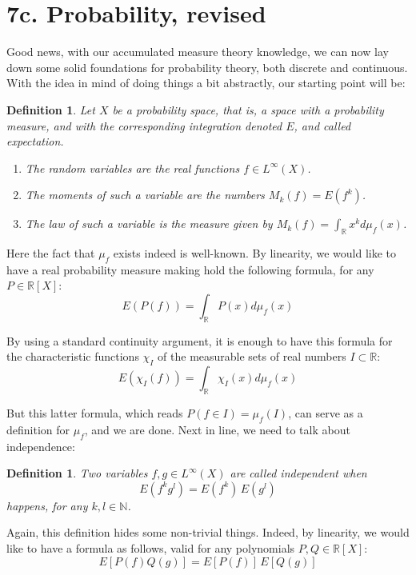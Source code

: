\documentclass[12pt]{amsbook}
\newtheorem{definition}[theorem]{Definition}
\begin{document}
\section*{7c. Probability, revised}

Good news, with our accumulated measure theory knowledge, we can now lay down some solid foundations for probability theory, both discrete and continuous. With the idea in mind of doing things a bit abstractly, our starting point will be:

\begin{definition}
Let $X$ be a probability space, that is, a space with a probability measure, and with the corresponding integration denoted $E$, and called expectation.
\begin{enumerate}
\item The random variables are the real functions $f\in L^\infty(X)$.

\item The moments of such a variable are the numbers $M_k(f)=E(f^k)$.

\item The law of such a variable is the measure given by $M_k(f)=\int_\mathbb Rx^kd\mu_f(x)$.
\end{enumerate}
\end{definition}

Here the fact that $\mu_f$ exists indeed is well-known. By linearity, we would like to have a real probability measure making hold the following formula, for any $P\in\mathbb R[X]$:
$$E(P(f))=\int_\mathbb RP(x)d\mu_f(x)$$

By using a standard continuity argument, it is enough to have this formula for the characteristic functions $\chi_I$ of the measurable sets of real numbers $I\subset\mathbb R$:
$$E(\chi_I(f))=\int_\mathbb R\chi_I(x)d\mu_f(x)$$

But this latter formula, which reads $P(f\in I)=\mu_f(I)$, can serve as a definition for $\mu_f$, and we are done. Next in line, we need to talk about independence:


\begin{definition}
Two variables $f,g\in L^\infty(X)$ are called independent when
$$E(f^kg^l)=E(f^k)\,E(g^l)$$
happens, for any $k,l\in\mathbb N$.
\end{definition}

Again, this definition hides some non-trivial things. Indeed, by linearity, we would like to have a formula as follows, valid for any polynomials $P,Q\in\mathbb R[X]$:
$$E[P(f)Q(g)]=E[P(f)]\,E[Q(g)]$$
\end{document}
